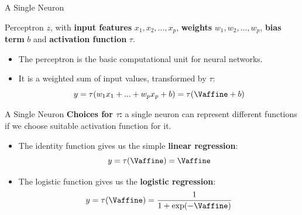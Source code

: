 \begin{vbframe} {A Single Neuron}
\begin{figure}
\centering
{}
\end{figure}
\vspace{-2mm}
\footnotesize Perceptron $z$, with \textbf{input features} $x_1, x_2, ... ,x_p$, \textbf{weights} $w_1, w_2,... ,w_p$, \textbf{bias term} $b$ and \textbf{activation function} $\tau$.
\vspace{.2cm}
\normalsize
\begin{itemize}
\item The perceptron is the basic computational unit for neural networks.
\vspace{.2cm}
\item It is a weighted sum of input values, transformed by $\tau$:
\vspace{-1mm}
$$y = \tau(w_1x_1 + ... + w_px_p +  b) = \tau(\Vaffine+b)$$
\end{itemize}
\end{vbframe}

\begin{vbframe}{A Single Neuron}
\textbf{Choices for $\tau$:} a single neuron can represent different functions if we choose suitable activation function for it.
\vspace{.5cm}
\begin{itemize}
\item The identity function gives us the simple \textbf{linear regression}:
$$y = \tau(\Vaffine) = \Vaffine$$
\vspace{.5cm}
\item The logistic function gives us the \textbf{logistic regression}:
$$y = \tau(\Vaffine) = \frac{1}{1 + \exp(-\Vaffine)}$$
\end{itemize}
\end{vbframe}

